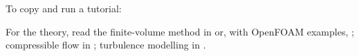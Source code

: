 To copy and run a tutorial:

For the theory, read the finite-volume method in \citet{versteeg2007} or, with OpenFOAM
examples, \citet{moukalled2016}; compressible flow in \citet{anderson2003}; turbulence
modelling in \citet{wilcox2006}.
